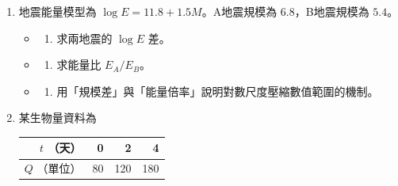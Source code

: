 \documentclass[11pt,a4paper]{article}
\newcounter{none}
\providecommand{\tightlist}{%
  \setlength{\itemsep}{0pt}\setlength{\parskip}{0pt}}
\begin{document}
\begin{enumerate}
  \begin{itemize}
  \tightlist
  \item
    \begin{enumerate}
    \def\labelenumii{(\alph{enumii})}
    \tightlist
    \item
      寫出 \(t\) 年後本利和 \(A(t)\)。
    \end{enumerate}
  \item
    \begin{enumerate}
    \def\labelenumii{(\alph{enumii})}
    \setcounter{enumii}{1}
    \tightlist
    \item
      求本利和首次超過 \(250{,}000\) 元的連續時間。
    \end{enumerate}
  \item
    \begin{enumerate}
    \def\labelenumii{(\alph{enumii})}
    \setcounter{enumii}{2}
    \tightlist
    \item
      若銀行只在每季末計入利息，至少需要幾季？
    \end{enumerate}
  \end{itemize}
\item
  地震能量模型為 \(\log E=11.8+1.5M\)。A地震規模為 \(6.8\)，B地震規模為 \(5.4\)。

  \begin{itemize}
  \tightlist
  \item
    \begin{enumerate}
    \def\labelenumii{(\alph{enumii})}
    \tightlist
    \item
      求兩地震的 \(\log E\) 差。
    \end{enumerate}
  \item
    \begin{enumerate}
    \def\labelenumii{(\alph{enumii})}
    \setcounter{enumii}{1}
    \tightlist
    \item
      求能量比 \(E_A/E_B\)。
    \end{enumerate}
  \item
    \begin{enumerate}
    \def\labelenumii{(\alph{enumii})}
    \setcounter{enumii}{2}
    \tightlist
    \item
      用「規模差」與「能量倍率」說明對數尺度壓縮數值範圍的機制。
    \end{enumerate}
  \end{itemize}
\item
  某生物量資料為

  {\def\LTcaptype{none} %
  \begin{longtable}[]{@{}rrrr@{}}
  \toprule\noalign{}
  \(t\) （天） & 0 & 2 & 4 \\
  \midrule\noalign{}
  \endhead
  \bottomrule\noalign{}
  \endlastfoot
  \(Q\) （單位） & 80 & 120 & 180 \\
  \end{longtable}
  }


\end{enumerate}
\end{document}
